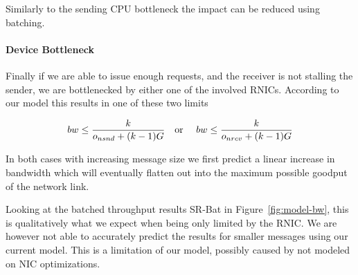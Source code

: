 Similarly to the sending CPU bottleneck the impact can be reduced using batching.


\paragraph{Device Bottleneck} Finally if we are able to issue enough requests, and the receiver is not stalling the sender,
we are bottlenecked by either one of the involved RNICs. According to our model this results in one of these two limits

$$
bw \leq \frac{k}{o_{nsnd} + (k-1)G} \text{\quad or \quad} bw \leq \frac{k}{o_{nrcv} + (k-1)G}
$$

In both cases with increasing message size we first predict a linear increase in bandwidth which will eventually 
flatten out into the maximum possible goodput of the network link.

Looking at the batched throughput results SR-Bat in Figure~\ref{fig:model-bw}, this is qualitatively what we expect 
when being only limited by the RNIC. We are however not able to accurately predict the results for smaller messages 
using our current model. This is a limitation of our model,  possibly caused by not modeled on NIC optimizations.
